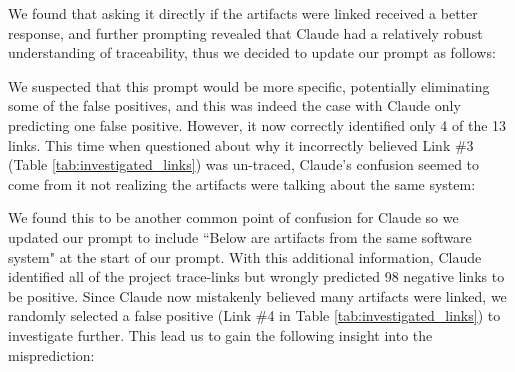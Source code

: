 


We found that asking it directly if the artifacts were linked received a better response, and further prompting revealed that Claude had a relatively robust understanding of traceability, thus we decided to update our prompt as follows: 

 We suspected that this prompt would be more specific, potentially eliminating some of the false positives, and this was indeed the case with Claude only predicting one false positive. However, it now correctly identified only 4 of the 13 links. This time when questioned about why it incorrectly believed Link \#3 (Table \ref{tab:investigated_links}) was un-traced, Claude's confusion seemed to come from it not realizing the artifacts were talking about the same system:


We found this to be another common point of confusion for Claude so we updated our prompt to include ``Below are artifacts from the same software system" at the start of our prompt. 
With this additional information, Claude identified all of the project trace-links but wrongly predicted 98 negative links to be positive. Since Claude now mistakenly believed many artifacts were linked, we randomly selected a false positive (Link \#4 in Table \ref{tab:investigated_links}) to investigate further. This lead us to gain the following insight into the misprediction: 
 


